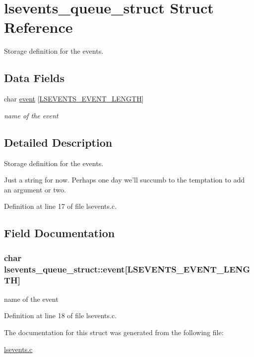 \hypertarget{structlsevents__queue__struct}{\section{lsevents\-\_\-queue\-\_\-struct Struct Reference}
\label{structlsevents__queue__struct}
}


Storage definition for the events.  


\subsection*{Data Fields}
\begin{DoxyCompactItemize}
\item 
char \hyperlink{structlsevents__queue__struct_a945691e4f4afbca101722840a891581e}{event} \mbox{[}\hyperlink{pgpmac_8h_ab61d790b5572f116e091babfda53627b}{L\-S\-E\-V\-E\-N\-T\-S\-\_\-\-E\-V\-E\-N\-T\-\_\-\-L\-E\-N\-G\-T\-H}\mbox{]}
\begin{DoxyCompactList}\small\item\em name of the event \end{DoxyCompactList}\end{DoxyCompactItemize}


\subsection{Detailed Description}
Storage definition for the events. 

Just a string for now. Perhaps one day we'll succumb to the temptation to add an argument or two. 

Definition at line 17 of file lsevents.\-c.



\subsection{Field Documentation}
\hypertarget{structlsevents__queue__struct_a945691e4f4afbca101722840a891581e}{
\subsubsection[{event}]{\setlength{\rightskip}{0pt plus 5cm}char lsevents\-\_\-queue\-\_\-struct\-::event\mbox{[}{\bf L\-S\-E\-V\-E\-N\-T\-S\-\_\-\-E\-V\-E\-N\-T\-\_\-\-L\-E\-N\-G\-T\-H}\mbox{]}}}\label{structlsevents__queue__struct_a945691e4f4afbca101722840a891581e}


name of the event 



Definition at line 18 of file lsevents.\-c.



The documentation for this struct was generated from the following file\-:\begin{DoxyCompactItemize}
\item 
\hyperlink{lsevents_8c}{lsevents.\-c}\end{DoxyCompactItemize}

